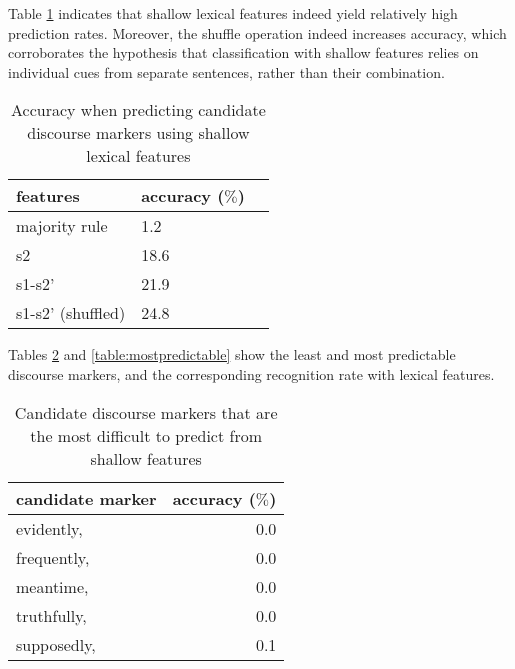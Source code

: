 \documentclass[11pt,a4paper]{article}
\begin{document}
Table \ref{table:resshallowpred} indicates that shallow lexical features indeed yield relatively high prediction rates. Moreover, the shuffle operation indeed increases accuracy, which corroborates the hypothesis that classification with shallow features relies on individual cues from separate sentences, rather than their combination.

\begin{table}[htb]
\begin{center}
\begin{tabular}{lll}
\toprule
features         & accuracy ($\%$) \\ \midrule
majority rule    & 1.2             \\
s2               & 18.6           \\
s1-s2'            & 21.9         \\    
s1-s2' (shuffled) & 24.8              \\
\bottomrule
\end{tabular}
\end{center}
\caption{Accuracy when predicting candidate discourse markers using shallow lexical features}
\label{table:resshallowpred}
\end{table}


Tables \ref{table:lesspredictable} and \ref{table:mostpredictable} show the least and most predictable discourse markers, and the corresponding recognition rate with lexical features. 

\begin{table}[htb]
\begin{center}
\begin{tabular}{lr}
\toprule
   candidate marker &  accuracy ($\%$) \\
\midrule
  evidently, &       0.0 \\
 frequently, &       0.0 \\
   meantime, &       0.0 \\
 truthfully, &       0.0 \\
 supposedly, &       0.1 \\
\bottomrule
\end{tabular}
\end{center}
\caption{Candidate discourse markers that are the most difficult to predict from shallow features}
\label{table:lesspredictable}
\end{table}
\end{document}
